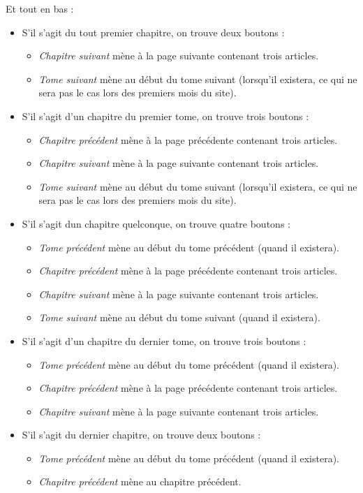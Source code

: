 \documentclass[french]{report}
\theoremstyle{plain}
\begin{document}
			Et tout en bas : 
			\begin{itemize}
				\item S'il s'agit du tout premier chapitre, on trouve deux boutons :
				\begin{itemize}
					\item \emph{Chapitre suivant} mène à la page suivante contenant trois articles.
					\item \emph{Tome suivant} mène au début du tome suivant (lorsqu'il existera, ce qui ne sera pas le cas lors des premiers mois du site).
				\end{itemize}
				\item S'il s'agit d'un chapitre du premier tome, on trouve trois boutons :
				\begin{itemize}
					\item \emph{Chapitre précédent} mène à la page précédente contenant trois articles.
					\item \emph{Chapitre suivant} mène à la page suivante contenant trois articles.
					\item \emph{Tome suivant} mène au début du tome suivant (lorsqu'il existera, ce qui ne sera pas le cas lors des premiers mois du site).
				\end{itemize}
				\item S'il s'agit dun chapitre quelconque, on trouve quatre boutons :
				\begin{itemize}
					\item \emph{Tome précédent} mène au début du tome précédent (quand il existera).
					\item \emph{Chapitre précédent} mène à la page précédente contenant trois articles.
					\item \emph{Chapitre suivant} mène à la page suivante contenant trois articles.
					\item \emph{Tome suivant} mène au début du tome suivant (quand il existera). 
				\end{itemize}
				\item S'il s'agit d'un chapitre du dernier tome, on trouve trois boutons :
				\begin{itemize}
					\item \emph{Tome précédent} mène au début du tome précédent (quand il existera).
					\item \emph{Chapitre précédent} mène à la page précédente contenant trois articles.
					\item \emph{Chapitre suivant} mène à la page suivante contenant trois articles.
				\end{itemize}
				\item S'il s'agit du dernier chapitre, on trouve deux boutons :
				\begin{itemize}
					\item \emph{Tome précédent} mène au début du tome précédent (quand il existera).
					\item \emph{Chapitre précédent} mène au chapitre précédent.
				\end{itemize}
			\end{itemize}
\end{document}
